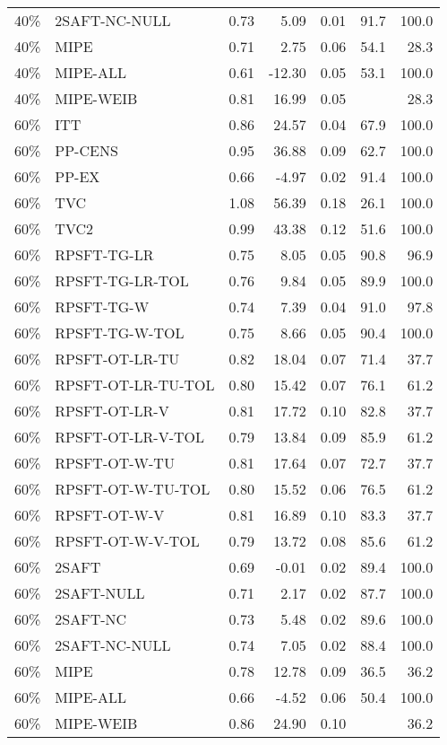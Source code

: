 \begin{table}[ht]
{\begin{tabular}{llrrrrr}
  40\% & 2SAFT-NC-NULL & 0.73 & 5.09 & 0.01 & 91.7 & 100.0 \\ 
  40\% & MIPE & 0.71 & 2.75 & 0.06 & 54.1 & 28.3 \\ 
  40\% & MIPE-ALL & 0.61 & -12.30 & 0.05 & 53.1 & 100.0 \\ 
  40\% & MIPE-WEIB & 0.81 & 16.99 & 0.05 &  & 28.3 \\ 
   \hline
60\% & ITT & 0.86 & 24.57 & 0.04 & 67.9 & 100.0 \\ 
  60\% & PP-CENS & 0.95 & 36.88 & 0.09 & 62.7 & 100.0 \\ 
  60\% & PP-EX & 0.66 & -4.97 & 0.02 & 91.4 & 100.0 \\ 
  60\% & TVC & 1.08 & 56.39 & 0.18 & 26.1 & 100.0 \\ 
  60\% & TVC2 & 0.99 & 43.38 & 0.12 & 51.6 & 100.0 \\ 
   \hline
60\% & RPSFT-TG-LR & 0.75 & 8.05 & 0.05 & 90.8 & 96.9 \\ 
  60\% & RPSFT-TG-LR-TOL & 0.76 & 9.84 & 0.05 & 89.9 & 100.0 \\ 
  60\% & RPSFT-TG-W & 0.74 & 7.39 & 0.04 & 91.0 & 97.8 \\ 
  60\% & RPSFT-TG-W-TOL & 0.75 & 8.66 & 0.05 & 90.4 & 100.0 \\ 
  60\% & RPSFT-OT-LR-TU & 0.82 & 18.04 & 0.07 & 71.4 & 37.7 \\ 
  60\% & RPSFT-OT-LR-TU-TOL & 0.80 & 15.42 & 0.07 & 76.1 & 61.2 \\ 
  60\% & RPSFT-OT-LR-V & 0.81 & 17.72 & 0.10 & 82.8 & 37.7 \\ 
  60\% & RPSFT-OT-LR-V-TOL & 0.79 & 13.84 & 0.09 & 85.9 & 61.2 \\ 
   \hline
60\% & RPSFT-OT-W-TU & 0.81 & 17.64 & 0.07 & 72.7 & 37.7 \\ 
  60\% & RPSFT-OT-W-TU-TOL & 0.80 & 15.52 & 0.06 & 76.5 & 61.2 \\ 
  60\% & RPSFT-OT-W-V & 0.81 & 16.89 & 0.10 & 83.3 & 37.7 \\ 
  60\% & RPSFT-OT-W-V-TOL & 0.79 & 13.72 & 0.08 & 85.6 & 61.2 \\ 
   \hline
60\% & 2SAFT & 0.69 & -0.01 & 0.02 & 89.4 & 100.0 \\ 
  60\% & 2SAFT-NULL & 0.71 & 2.17 & 0.02 & 87.7 & 100.0 \\ 
  60\% & 2SAFT-NC & 0.73 & 5.48 & 0.02 & 89.6 & 100.0 \\ 
  60\% & 2SAFT-NC-NULL & 0.74 & 7.05 & 0.02 & 88.4 & 100.0 \\ 
  60\% & MIPE & 0.78 & 12.78 & 0.09 & 36.5 & 36.2 \\ 
  60\% & MIPE-ALL & 0.66 & -4.52 & 0.06 & 50.4 & 100.0 \\ 
  60\% & MIPE-WEIB & 0.86 & 24.90 & 0.10 &  & 36.2 \\ 
   \hline
\end{tabular}
}
\end{table}
